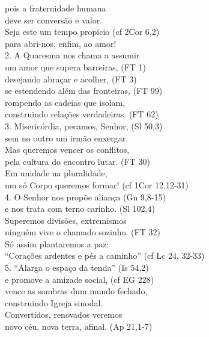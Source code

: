 \documentclass{book}
\begin{document}
\begin{flushleft}
{        pois a fraternidade humana \\
        deve ser conversão e valor. \\
        Seja este um tempo propício (cf 2Cor 6,2) \\
        para abri-nos, enfim, ao amor!}
    \vspace{.2cm} \\
    2. A Quaresma nos chama a assumir \\
    um amor que supera barreiras, (FT 1) \\
    desejando abraçar e acolher, (FT 3) \\
    se estendendo além das fronteiras, (FT 99) \\
    rompendo as cadeias que isolam, \\
    construindo relações verdadeiras. (FT 62) \\
    3. Misericórdia, pecamos, Senhor, (Sl 50,3) \\
    sem no outro um irmão enxergar. \\
    Mas queremos vencer os conflitos, \\
    pela cultura do encontro lutar. (FT 30) \\
    Em unidade na pluralidade, \\
    um só Corpo queremos formar! (cf 1Cor 12,12-31) \\
    4. O Senhor nos propõe aliança (Gn 9,8-15) \\
    e nos trata com terno carinho. (Sl 102,4) \\
    Superemos divisões, extremismos \\
    ninguém vive o chamado sozinho. (FT 32) \\
    Só assim plantaremos a paz: \\
    “Corações ardentes e pés a caminho” (cf Lc 24, 32-33) \\
    5. “Alarga o espaço da tenda” (Is 54,2) \\
    e promove a amizade social, (cf EG 228) \\
    vence as sombras dum mundo fechado, \\
    construindo Igreja sinodal. \\
    Convertidos, renovados veremos \\
    novo céu, nova terra, afinal. (Ap 21,1-7)
\end{flushleft}
\end{document}
